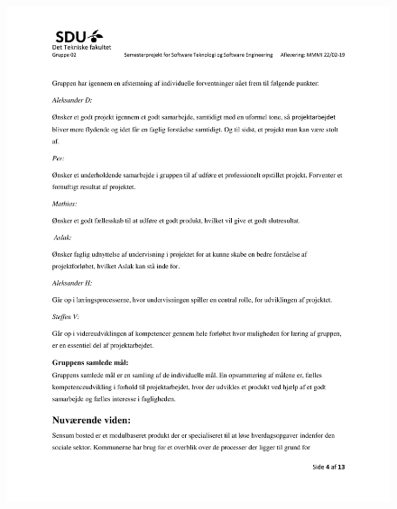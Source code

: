 \begin{figure}[hb]
  \includegraphics[scale = 0.33]{./PNG/Projektforslag/Projektforslag-04.jpg} 
\end{figure}

